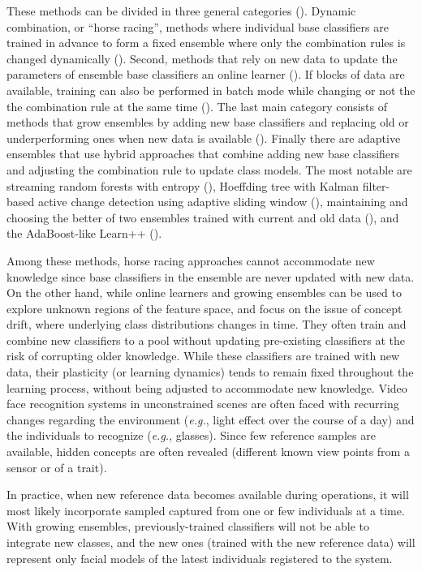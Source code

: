 These methods can be divided in three general categories (\cite{kuncheva04}).
Dynamic combination, or ``horse racing'', methods where individual base classifiers are trained in advance to form a fixed ensemble where only the combination rules is changed dynamically (\cite{blum97, widmer96, xingquan04}).
Second, methods that rely on new data to update the parameters of ensemble base classifiers an online learner (\cite{gama04}).
If blocks of data are available, training can also be performed in batch mode while changing or not the the combination rule at the same time (\cite{breiman99, ganti02, oza01, wang03}).
The last main category consists of methods that grow ensembles by adding new base classifiers and replacing old or underperforming ones when new data is available (\cite{chen01, kolter07, street01, tsymbal08}).
Finally there are adaptive ensembles that use hybrid approaches that combine adding new base classifiers and adjusting the combination rule to update class models.
The most notable are streaming random forests with entropy (\cite{abdulsalam11}), Hoeffding tree with Kalman filter-based active change detection using adaptive sliding window (\cite{bifet10}), maintaining and choosing the better of two ensembles trained with current and old data (\cite{scholz06}), and the AdaBoost-like Learn++ (\cite{polikar01}).

Among these methods, horse racing approaches cannot accommodate new knowledge since base classifiers in the ensemble are never updated with new data.
On the other hand, while online learners and growing ensembles can be used to explore unknown regions of the feature space, and focus on the issue of concept drift, where underlying class distributions changes in time.
They often train and combine new classifiers to a pool without updating pre-existing classifiers at the risk of corrupting older knowledge.
While these classifiers are trained with new data, their plasticity (or learning dynamics) tends to remain fixed throughout the learning process, without being adjusted to accommodate new knowledge.
Video face recognition systems in unconstrained scenes are often faced with recurring changes regarding the environment (\emph{e.g.}, light effect over the course of a day) and the individuals to recognize (\emph{e.g.}, glasses).
Since few reference samples are available, hidden concepts are often revealed  (different known view points from a sensor or of a trait).

In practice, when new reference data becomes available during operations, it will most likely incorporate sampled captured from one or few individuals at a time.
With growing ensembles, previously-trained classifiers will not be able to integrate new classes, and the new ones (trained with the new reference data) will represent only facial models of the latest individuals registered to the system.

